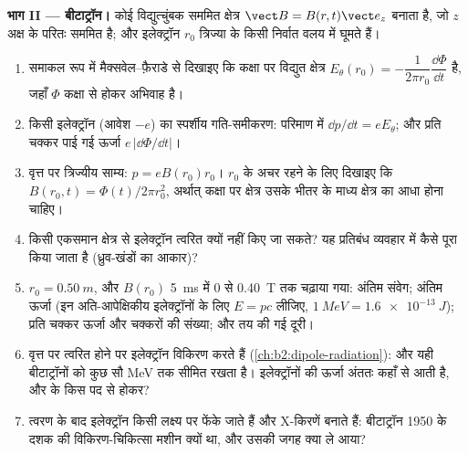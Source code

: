 \begin{problem}
\medskip
\noindent\textbf{भाग II --- बीटाट्रॉन।}
कोई विद्युत्चुंबक सममित क्षेत्र $\vect B = B(r, t)\vect e_z$ बनाता है, जो
$z$ अक्ष के परितः सममित है; और इलेक्ट्रॉन $r_0$ त्रिज्या के किसी निर्वात वलय में घूमते हैं।
\begin{enumerate}[resume]
  \item समाकल रूप में मैक्सवेल--फ़ैराडे से दिखाइए कि
        कक्षा पर विद्युत क्षेत्र $E_\theta(r_0) = -\dfrac1{2\pi r_0}
        \dfrac{\dd\Phi}{\dd t}$ है, जहाँ $\Phi$ कक्षा से होकर अभिवाह है।
  \item किसी इलेक्ट्रॉन (आवेश $-e$) का स्पर्शीय गति-समीकरण:
        परिमाण में $\dd p/\dd t = eE_\theta$; और प्रति चक्कर पाई गई ऊर्जा
        $e\,|\dd\Phi/\dd t|$।
  \item वृत्त पर त्रिज्यीय साम्य: $p = eB(r_0)r_0$। $r_0$ के
        अचर रहने के लिए दिखाइए कि $B(r_0, t) = \Phi(t)/2\pi r_0^2$, अर्थात्
        कक्षा पर क्षेत्र उसके भीतर के माध्य क्षेत्र का आधा होना चाहिए।
  \item किसी एकसमान क्षेत्र से इलेक्ट्रॉन त्वरित क्यों नहीं किए जा सकते?
        यह प्रतिबंध व्यवहार में कैसे पूरा किया जाता है (ध्रुव-खंडों का
        आकार)?
  \item $r_0 = \qty{0.50}{m}$, और $B(r_0)$ \qty{5}{ms} में $0$ से \qty{0.40}{T} तक
        चढ़ाया गया: अंतिम संवेग; अंतिम ऊर्जा (इन
        अति-आपेक्षिकीय इलेक्ट्रॉनों के लिए $E = pc$ लीजिए, $\qty{1}{MeV} = \qty{1.6e-13}{J}$);
        प्रति चक्कर ऊर्जा और चक्करों की संख्या; और तय की गई दूरी।
  \item वृत्त पर त्वरित होने पर इलेक्ट्रॉन विकिरण करते हैं
        (\cref{ch:b2:dipole-radiation}): और यही बीटाट्रॉनों को कुछ
        सौ \unit{MeV} तक सीमित रखता है। इलेक्ट्रॉनों की ऊर्जा अंततः कहाँ से
        आती है, और  के किस पद से होकर?
  \item त्वरण के बाद इलेक्ट्रॉन किसी लक्ष्य पर फेंके जाते हैं और
        X-किरणें बनाते हैं: बीटाट्रॉन 1950 के दशक की विकिरण-चिकित्सा मशीन
        क्यों था, और उसकी जगह क्या ले आया?
\end{enumerate}


\end{problem}
